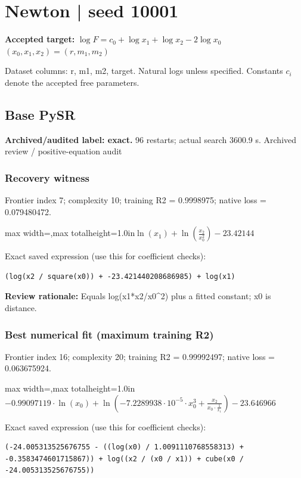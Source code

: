 \documentclass[10pt,letterpaper,landscape]{article}
\begin{document}
\section*{Newton | seed 10001}
\textbf{Accepted target:} $\displaystyle \log F=c_0+\log x_1+\log x_2-2\log x_0$\hfill $(x_0,x_1,x_2)=(r,m_1,m_2)$\par
{\small Dataset columns: r, m1, m2, target. Natural logs unless specified. Constants $c_i$ denote the accepted free parameters.}\par\medskip
\begin{minipage}[t]{0.485\textwidth}
\subsection*{Base PySR}
\textbf{Archived/audited label: exact.} 96 restarts; actual search 3600.9 s.
{\small Archived review / positive-equation audit}
\subsubsection*{Recovery witness}
Frontier index 7; complexity 10; training R2 = 0.9998975; native loss = 0.079480472.
\begin{center}\begin{adjustbox}{max width=\linewidth,max totalheight=1.0in}$\displaystyle \ln{\left(x_{1} \right)} + \ln{\left(\frac{x_{2}}{x_{0}^{2}} \right)} - 23.42144$\end{adjustbox}\end{center}
{\scriptsize Exact saved expression (use this for coefficient checks):}
\begin{lstlisting}
(log(x2 / square(x0)) + -23.421440208686985) + log(x1)
\end{lstlisting}
{\small\textbf{Review rationale:} Equals log(x1*x2/x0\textasciicircum{}2) plus a fitted constant; x0 is distance.}
\subsubsection*{Best numerical fit (maximum training R2)}
Frontier index 16; complexity 20; training R2 = 0.99992497; native loss = 0.063675924.
\begin{center}\begin{adjustbox}{max width=\linewidth,max totalheight=1.0in}$\displaystyle - 0.99097119 \cdot \ln{\left(x_{0} \right)} + \ln{\left(- 7.2289938 \cdot 10^{-5} \cdot x_{0}^{3} + \frac{x_{2}}{x_{0} \cdot \frac{1}{x_{1}}} \right)} - 23.646966$\end{adjustbox}\end{center}
{\scriptsize Exact saved expression (use this for coefficient checks):}
\begin{lstlisting}
(-24.005313525676755 - ((log(x0) / 1.0091110768558313) + -0.3583474601715867)) + log((x2 / (x0 / x1)) + cube(x0 / -24.005313525676755))
\end{lstlisting}
\end{minipage}\hfill
\end{document}
